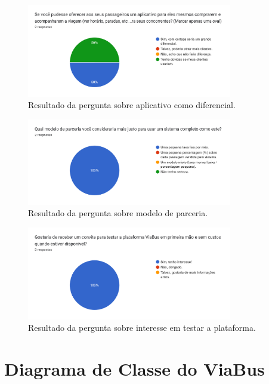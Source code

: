 \begin{apendicesenv}
  \begin{figure}[htbp]
    \centering
    \includegraphics[width=0.8\textwidth]{imagens/imagem9.png}
    \caption{Resultado da pergunta sobre aplicativo como diferencial.}
    \label{fig:resultado9}
  \end{figure}

  \begin{figure}[htbp]
    \centering
    \includegraphics[width=0.8\textwidth]{imagens/imagem10.png}
    \caption{Resultado da pergunta sobre modelo de parceria.}
    \label{fig:resultado10}
  \end{figure}

  \begin{figure}[htbp]
    \centering
    \includegraphics[width=0.8\textwidth]{imagens/imagem11.png}
    \caption{Resultado da pergunta sobre interesse em testar a plataforma.}
    \label{fig:resultado11}
  \end{figure}

  \chapter{Diagrama de Classe do ViaBus}
  \label{apendice:diagrama-classe}


\end{apendicesenv}
